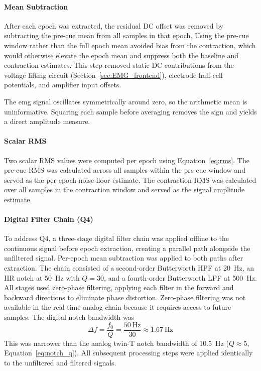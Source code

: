 \paragraph{Mean Subtraction} 
After each epoch was extracted, the residual DC offset was removed by subtracting the pre-cue mean from all samples in that epoch. Using the pre-cue window rather than the full epoch mean avoided bias from the contraction, which would otherwise elevate the epoch mean and suppress both the baseline and contraction estimates. This step removed static DC contributions from the voltage lifting circuit (Section~\ref{sec:EMG_frontend}), electrode half-cell potentials, and amplifier input offsets.

The \gls{emg} signal oscillates symmetrically around zero, so the arithmetic mean is uninformative. Squaring each sample before averaging removes the sign and yields a direct amplitude measure.  

\paragraph{Scalar RMS}
Two scalar RMS values were computed per epoch using Equation~\ref{eq:rms}. The pre-cue RMS was calculated across all samples within the pre-cue window and served as the per-epoch noise-floor estimate. The contraction RMS was calculated over all samples in the contraction window and served as the signal amplitude estimate.

\paragraph{Digital Filter Chain (Q4)}
To address Q4, a three-stage digital filter chain was applied offline to the continuous signal before epoch extraction, creating a parallel path alongside the unfiltered signal. Per-epoch mean subtraction was applied to both paths after extraction. The chain consisted of a second-order Butterworth HPF at \SI{20}{\hertz}, an IIR notch at \SI{50}{\hertz} with $Q = 30$, and a fourth-order Butterworth LPF at \SI{500}{\hertz}. All stages used zero-phase filtering, applying each filter in the forward and backward directions to eliminate phase distortion. Zero-phase filtering was not available in the real-time analog chain because it requires access to future samples. The digital notch bandwidth was
\begin{equation}
    \Delta f = \frac{f_0}{Q} = \frac{\SI{50}{\hertz}}{30} \approx \SI{1.67}{\hertz}
    \label{eq:digital_notch_bw}
\end{equation}
This was narrower than the analog twin-T notch bandwidth of \SI{10.5}{\hertz} ($Q \approx 5$, Equation~\ref{eq:notch_q}). All subsequent processing steps were applied identically to the unfiltered and filtered signals.


